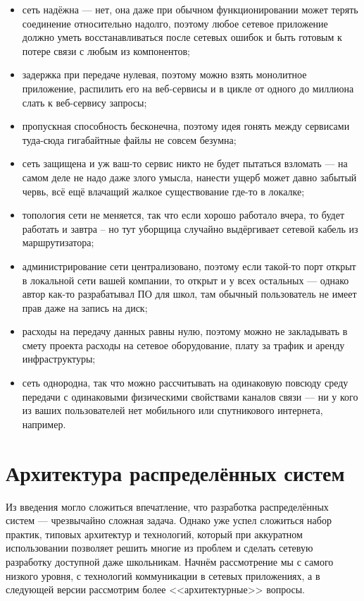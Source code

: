 \documentclass{../../text-style}
\begin{document}
\begin{itemize}
    \item сеть надёжна --- нет, она даже при обычном функционировании может терять соединение относительно надолго, поэтому любое сетевое приложение должно уметь восстанавливаться после сетевых ошибок и быть готовым к потере связи с любым из компонентов;
    \item задержка при передаче нулевая, поэтому можно взять монолитное приложение, распилить его на веб-сервисы и в цикле от одного до миллиона слать к веб-сервису запросы;
    \item пропускная способность бесконечна, поэтому идея гонять между сервисами туда-сюда гигабайтные файлы не совсем безумна;
    \item сеть защищена и уж ваш-то сервис никто не будет пытаться взломать --- на самом деле не надо даже злого умысла, нанести ущерб может давно забытый червь, всё ещё влачащий жалкое существование где-то в локалке;
    \item топология сети не меняется, так что если хорошо работало вчера, то будет работать и завтра -- но тут уборщица случайно выдёргивает сетевой кабель из маршрутизатора;
    \item администрирование сети централизовано, поэтому если такой-то порт открыт в локальной сети вашей компании, то открыт и у всех остальных --- однако автор как-то разрабатывал ПО для школ, там обычный пользователь не имеет прав даже на запись на диск;
    \item расходы на передачу данных равны нулю, поэтому можно не закладывать в смету проекта расходы на сетевое оборудование, плату за трафик и аренду инфраструктуры;
    \item сеть однородна, так что можно рассчитывать на одинаковую повсюду среду передачи с одинаковыми физическими свойствами каналов связи --- ни у кого из ваших пользователей нет мобильного или спутникового интернета, например.
\end{itemize}

\section{Архитектура распределённых систем}

Из введения могло сложиться впечатление, что разработка распределённых систем --- чрезвычайно сложная задача. Однако уже успел сложиться набор практик, типовых архитектур и технологий, который при аккуратном использовании позволяет решить многие из проблем и сделать сетевую разработку доступной даже школьникам. Начнём рассмотрение мы с самого низкого уровня, с технологий коммуникации в сетевых приложениях, а в следующей версии рассмотрим более <<архитектурные>> вопросы.
\end{document}

